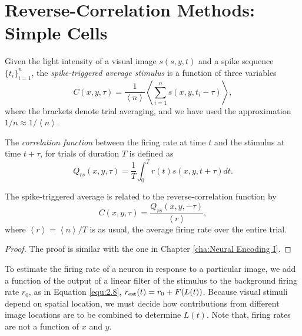 \section{Reverse-Correlation Methods: Simple Cells}
\label{sec:ReverseCorrelationMethodsForSimpleCells}
\begin{defn}
  \label{def: spikeTriggeredAverage}
  Given the light intensity of a visual image $s(s,y,t)$ and a spike sequence $\{t_i\}_{i = 1}^n$, the \emph{spike-triggered average stimulus}  is a function of three variables
  \begin{equation}
    \label{equ:2.21}
    C(x,y,\tau) = \frac{1}{\left<n\right>}\left<\sum\limits_{i = 1}^ns(x,y,t_i-\tau)\right>,
  \end{equation}
  where the brackets denote trial averaging, and we have used the approximation $1/n \approx 1/\left<n\right>$.
\end{defn}

\begin{defn}
  \label{def:crrelationFuncForVisual}
  The \emph{correlation function} between the firing rate at time $t$ and the stimulus at time $t+\tau$, for trials of duration $T$ is defined as
  \begin{equation}
    \label{equ:2.22}
    Q_{rs}(x,y,\tau) = \frac{1}{T}\int_0^Tr(t) s(x,y,t+\tau)dt.
  \end{equation}
\end{defn}

\begin{prop}
  \label{prop:CQ_relation}
  The spike-triggered average is related to the reverse-correlation function by
  \begin{equation}
    \label{equ:2.23}
    C(x,y,\tau) = \frac{Q_{rs}(x,y,-\tau)}{\left<r\right>},
  \end{equation}
  where $\left<r\right> = \left<n\right>/T$ is as usual, the average firing rate over the entire trial.
\end{prop}
\begin{proof}
  The proof is similar with the one in Chapter \ref{cha:Neural Encoding I}.
\end{proof}

\begin{rem}
  To estimate the firing rate of a neuron in response to a particular image, we add a function of the output of a linear filter of the stimulus to the background firing rate $r_0$, as in Equation \ref{equ:2.8}, $r_{\rm{est}}(t) = r_0 + F(L(t))$. Because visual stimuli depend on spatial location, we must decide how contributions from different image locations are to be combined to determine $L(t)$. Note that, firing rates are not a function of $x$ and $y$.
\end{rem}

